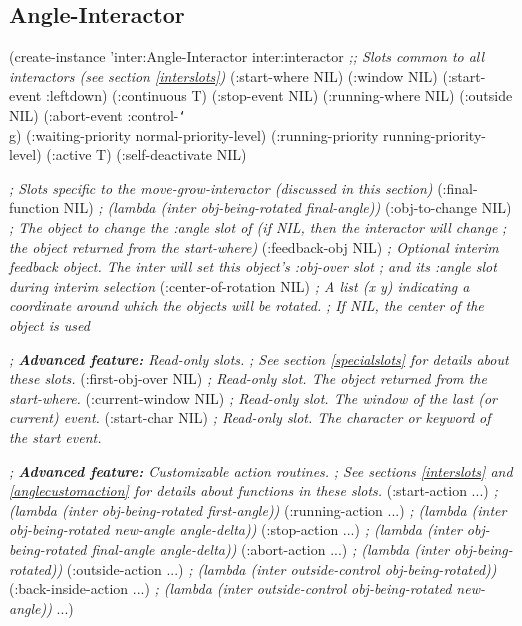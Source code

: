 \begin{group}
\section{Angle-Interactor}

\begin{programexample}
(create-instance 'inter:Angle-Interactor inter:interactor
  {\it ;; Slots common to all interactors (see section \ref{interslots})}
  (:start-where NIL)
  (:window NIL)
  (:start-event :leftdown)
  (:continuous T)
  (:stop-event NIL)
  (:running-where NIL)
  (:outside NIL)
  (:abort-event :control-{\tt\char`\\}g)
  (:waiting-priority normal-priority-level)
  (:running-priority running-priority-level)
  (:active T)
  (:self-deactivate NIL)

  {\it ; Slots specific to the move-grow-interactor (discussed in this section)}
  (:final-function NIL)      {\it ; (lambda (inter obj-being-rotated final-angle))}
  (:obj-to-change NIL)       {\it ; The object to change the :angle slot of (if NIL, then the interactor will change}
                             {\it ; the object returned from the start-where)}
  (:feedback-obj NIL)        {\it ; Optional interim feedback object.  The inter will set this object's :obj-over slot}
                             {\it ; and its :angle slot during interim selection}
  (:center-of-rotation NIL)  {\it ; A list (x y) indicating a coordinate around which the objects will be rotated.}
                             {\it ; If NIL, the center of the object is used}

  {\it ; {\bf Advanced feature:}  Read-only slots.}
  {\it ; See section \ref{specialslots} for details about these slots.}
  (:first-obj-over NIL)     {\it ; Read-only slot.  The object returned from the start-where.}
  (:current-window NIL)     {\it ; Read-only slot.  The window of the last (or current) event.}
  (:start-char NIL)         {\it ; Read-only slot.  The character or keyword of the start event.}

  {\it ; {\bf Advanced feature:} Customizable action routines.}
  {\it ; See sections \ref{interslots} and \ref{anglecustomaction} for details about functions in these slots.}
  (:start-action ...)       {\it ; (lambda (inter obj-being-rotated first-angle))}
  (:running-action ...)     {\it ; (lambda (inter obj-being-rotated new-angle angle-delta))}
  (:stop-action ...)        {\it ; (lambda (inter obj-being-rotated final-angle angle-delta))}
  (:abort-action ...)       {\it ; (lambda (inter obj-being-rotated))}
  (:outside-action ...)     {\it ; (lambda (inter outside-control obj-being-rotated))}
  (:back-inside-action ...) {\it ; (lambda (inter outside-control obj-being-rotated new-angle))}
...)
\end{programexample}
\end{group}

